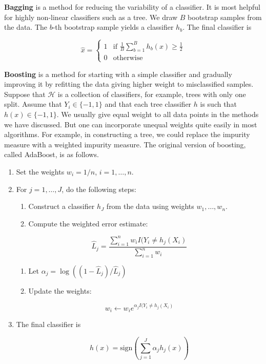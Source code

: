 \textbf{Bagging} is a method for reducing the variability of a
classifier. It is most helpful for highly non-linear classifiers such as
a tree. We draw \(B\) bootstrap samples from the data. The \(b\)-th
bootstrap sample yields a classifier \(h_b\). The final classifier is

\[ 
\hat{x} = \begin{cases}
1 & \text{if } \frac{1}{B} \sum_{b=1}^B h_b(x) \geq \frac{1}{2} \\
0 & \text{otherwise}
\end{cases}
\]

\textbf{Boosting} is a method for starting with a simple classifier and
gradually improving it by refitting the data giving higher weight to
misclassified samples. Suppose that \(\mathcal{H}\) is a collection of
classifiers, for example, trees with only one split. Assume that
\(Y_{i} \in \{ -1, 1 \}\) and that each tree classifier \(h\) is such that
\(h(x) \in \{ -1, 1 \}\). We usually give equal weight to all data
points in the methods we have discussed. But one can incorporate unequal
weights quite easily in most algorithms. For example, in constructing a
tree, we could replace the impurity measure with a weighted impurity
measure. The original version of boosting, called AdaBoost, is as
follows.

\begin{enumerate}
\def\labelenumi{\arabic{enumi}.}
\item
  Set the weights \(w_{i} = 1 / n\), \(i = 1, \dots, n\).
\item
  For \(j = 1, \dots, J\), do the following steps:

  \begin{enumerate}
  \def\labelenumii{(\alph{enumii})}
  \item
    Construct a classifier \(h_J\) from the data using weights
\(w_{1}, \dots, w_{n}\).
  \item
    Compute the weighted error estimate:
  \end{enumerate}

  \[ \hat{L}_{j} = \frac{\sum_{i=1}^{n} w_{i} I(Y_{i} \neq h_{j}(X_{i}) }{\sum_{i=1}^{n} w_{i}} \]

  \begin{enumerate}
  \def\labelenumii{(\alph{enumii})}
  \setcounter{enumii}{2}
  \item
    Let \(\alpha_{j} = \log (( 1 - \hat{L}_{j}) / \hat{L}_{j})\)
  \item
    Update the weights:
  \end{enumerate}

  \[ w_{i} \leftarrow w_{i} e^{\alpha_{j} I(Y_{i} \neq h_{j}(X_{i})} \]
\item
  The final classifier is

  \[ \hat{h}(x) = \text{sign} \left( \sum_{j=1}^J \alpha_{j} h_{j}(x) \right) \]
\end{enumerate}

